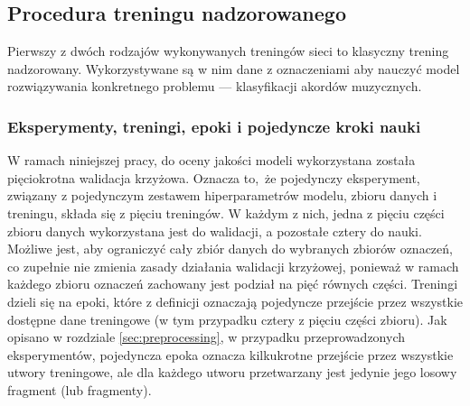 \subsection{Procedura treningu nadzorowanego}

Pierwszy z dwóch rodzajów wykonywanych treningów sieci to klasyczny trening nadzorowany.
Wykorzystywane są w nim dane z oznaczeniami aby nauczyć model rozwiązywania konkretnego problemu ---
klasyfikacji akordów muzycznych. 

\subsubsection{Eksperymenty, treningi, epoki i pojedyncze kroki nauki}

W ramach niniejszej pracy, do oceny jakości modeli wykorzystana została pięciokrotna walidacja
krzyżowa. Oznacza to, że pojedynczy eksperyment, związany z pojedynczym zestawem hiperparametrów
modelu, zbioru danych i treningu, składa się z pięciu treningów. W każdym z nich, jedna z pięciu
części zbioru danych wykorzystana jest do walidacji, a pozostałe cztery do nauki. Możliwe jest, aby
ograniczyć cały zbiór danych do wybranych zbiorów oznaczeń, co zupełnie nie zmienia zasady działania
walidacji krzyżowej, ponieważ w ramach każdego zbioru oznaczeń zachowany jest podział na pięć
równych części. Treningi dzieli się na epoki, które z definicji oznaczają pojedyncze przejście przez
wszystkie dostępne dane treningowe (w tym przypadku cztery z pięciu części zbioru). Jak opisano w
rozdziale \ref{sec:preprocessing}, w przypadku przeprowadzonych eksperymentów, pojedyncza epoka
oznacza kilkukrotne przejście przez wszystkie utwory treningowe, ale dla każdego utworu przetwarzany
jest jedynie jego losowy fragment (lub fragmenty).

